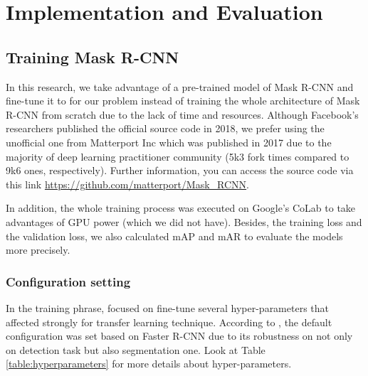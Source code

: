 \chapter{Implementation and Evaluation}
\section{Training Mask R-CNN}
\noindent
	
	In this research, we take advantage of a pre-trained model of Mask R-CNN and fine-tune it to for our problem instead of training the whole architecture of Mask R-CNN from scratch due to the lack of time and resources. Although Facebook's researchers published the official source code in 2018, we prefer using the unofficial one from Matterport Inc which was published in 2017 due to the majority of deep learning practitioner community (5k3 fork times compared to 9k6 ones, respectively). Further information, you can access the source code via this link \url{https://github.com/matterport/Mask_RCNN}.
	
	In addition, the whole training process was executed on Google's CoLab to take advantages of GPU power (which we did not have). Besides, the training loss and the validation loss, we also calculated mAP and mAR to evaluate the models more precisely.
	
\subsection{Configuration setting}
\noindent

	In the training phrase, focused on fine-tune several hyper-parameters that affected strongly for transfer learning technique. According to \cite{maskrcnn}, the default configuration was set based on Faster R-CNN due to its robustness on not only on detection task but also segmentation one. Look at Table \ref{table:hyperparameters} for more details about hyper-parameters.
	
